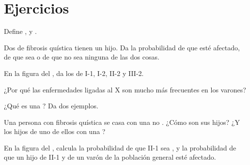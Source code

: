 \section{Ejercicios}

\begin{exercise}[$\star$]\label{exo:g11:genes-and-disease:1}
Define  ,   y .
\end{exercise}

\begin{exercise}[$\star$]\label{exo:g11:genes-and-disease:2}
Dos  de fibrosis quística tienen un hijo. Da la probabilidad
de que esté afectado, de que sea  o de que no sea ninguna de
las dos cosas.
\end{exercise}

\begin{exercise}[$\star$]\label{exo:g11:genes-and-disease:3}
En la figura del , da los  de I-1, I-2, II-2
y III-2.
\end{exercise}

\begin{exercise}[$\star$]\label{exo:g11:genes-and-disease:4}
¿Por qué las enfermedades  ligadas al X son mucho más
frecuentes en los varones?
\end{exercise}

\begin{exercise}[$\star$]\label{exo:g11:genes-and-disease:5}
¿Qué es una ? Da dos ejemplos.
\end{exercise}

\begin{exercise}[$\star\star$]\label{exo:g11:genes-and-disease:6}
Una persona con fibrosis quística se casa con una no . ¿Cómo
son sus hijos? ¿Y los hijos de uno de ellos con una ?
\end{exercise}

\begin{exercise}[$\star\star$]\label{exo:g11:genes-and-disease:7}
En la figura del , calcula la probabilidad de que II-1
sea , y la probabilidad de que un hijo de II-1 y de un varón
de la población general esté afectado.
\end{exercise}

